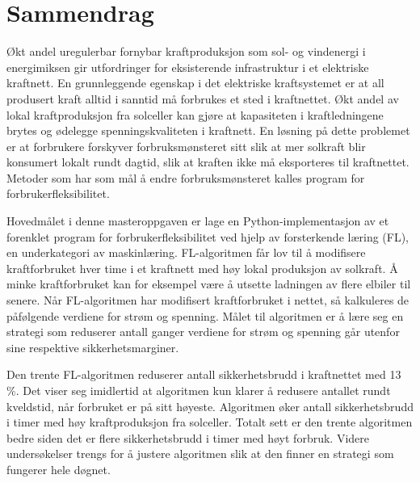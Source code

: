 \documentclass[class=book, crop=false, 11pt]{standalone}
\begin{document}
\chapter{Sammendrag}
Økt andel uregulerbar fornybar kraftproduksjon som sol- og vindenergi i energimiksen gir utfordringer for eksisterende infrastruktur i et elektriske kraftnett. En grunnleggende egenskap i det elektriske kraftsystemet er at all produsert kraft alltid i sanntid må forbrukes et sted i kraftnettet. Økt andel av lokal kraftproduksjon fra solceller kan gjøre at kapasiteten i kraftledningene brytes og ødelegge spenningskvaliteten i kraftnett. En løsning på dette problemet er at forbrukere forskyver forbruksmønsteret sitt slik at mer solkraft blir konsumert lokalt rundt dagtid, slik at kraften ikke må eksporteres til kraftnettet. Metoder som har som mål å endre forbruksmønsteret kalles program for forbrukerfleksibilitet.

Hovedmålet i denne masteroppgaven er lage en Python-implementasjon av et forenklet program for forbrukerfleksibilitet ved hjelp av forsterkende læring (FL), en underkategori av maskinlæring. FL-algoritmen får lov til å modifisere kraftforbruket hver time i et kraftnett med høy lokal produksjon av solkraft. Å minke kraftforbruket kan for eksempel være å utsette ladningen av flere elbiler til senere. Når FL-algoritmen har modifisert kraftforbruket i nettet, så kalkuleres de påfølgende verdiene for strøm og spenning. Målet til algoritmen er å lære seg en strategi som reduserer antall ganger verdiene for strøm og spenning går utenfor sine respektive sikkerhetsmarginer.

Den trente FL-algoritmen reduserer antall sikkerhetsbrudd i kraftnettet med 13 \%.  Det viser seg imidlertid at algoritmen kun klarer å redusere antallet rundt kveldstid, når forbruket er på sitt høyeste. Algoritmen øker antall sikkerhetsbrudd i timer med høy kraftproduksjon fra solceller. Totalt sett er den trente algoritmen bedre siden det er flere sikkerhetsbrudd i timer med høyt forbruk. Videre undersøkelser trengs for å justere algoritmen slik at den finner en strategi som fungerer hele døgnet. 
\end{document}
